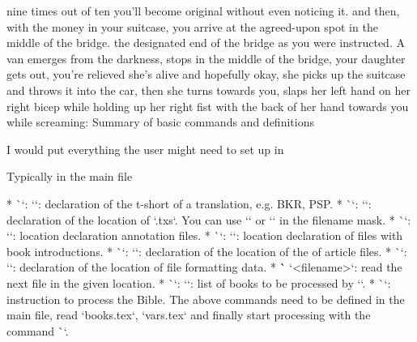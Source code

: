 {{{{{{{%
nine times out of ten you'll become original without even noticing it. 
%
%
%
and then, with the money in your suitcase, you arrive at the agreed-upon spot in the middle of the bridge. 
the designated end of the bridge as you were instructed. A van emerges from the darkness, stops in the middle of the bridge, 
your daughter gets out, you're relieved she's alive and hopefully okay, she picks up the suitcase and throws it 
into the car, then she turns towards you, slaps her left hand on her right bicep while holding up 
her right fist with the back of her hand towards you while screaming:  
%
%
%
%
%
%
\sec[sum] Summary of basic commands and definitions

I would put everything the user might need to set up in %

\secc Typically in the main file

\begitems
* \`\tmark`: `\def\tmark{<t-short>}`: declaration of the t-short of a translation, e.g. BKR, PSP.
* \`\txsfile`: `\def\txsfile {<filename mask>}`: declaration of the location of `.txs`. 
  You can use `\amark` or `\bmark` in the filename mask. 
* \`\notesfile`: `\def\notesfile {<filename mask>}`: location declaration
   annotation files. 
* \`\introfile`: `\def\introfile {<filename mask>}`: location declaration
   of files with book introductions. 
* \`\articlefile`: `\def\articlefile {<filename mask>}`: declaration of the location of the
   of article files.
* \`\fmtfile`: `\def\fmtfile {<filename mask>}`: declaration of the location of
   file formatting data. 
* \`` `{<filename>}`: read the next file in the given location.
* \`\printedbooks`: `\def\printedbooks {<list of a-bookmarks>}`:
  list of books to be processed by `\processbooks`.
* \`\processbooks`: instruction to process the Bible.
\enditems
The above commands need to be defined in the main file, 
read `books.tex`, `vars.tex` and finally start processing with the command
\`\processboks`.

}}}}}}}

